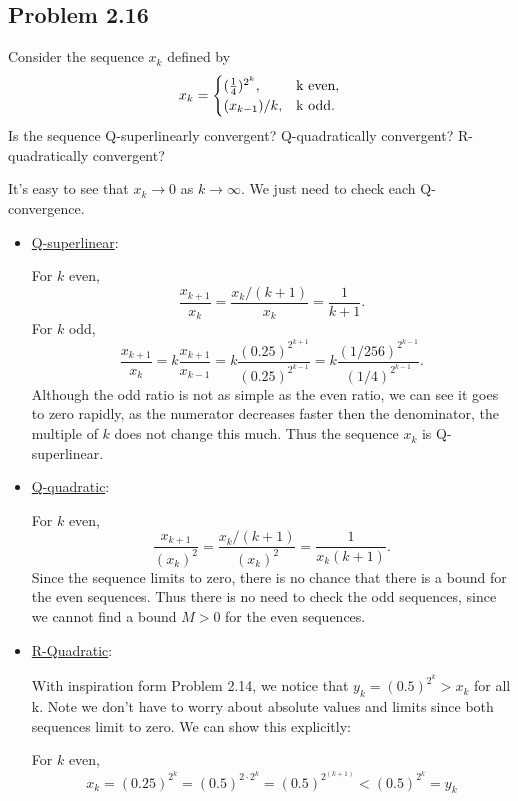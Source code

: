  \subsection{Problem 2.16}
 Consider the sequence $x_k$ defined by 
 \[
 x_k = \begin{cases}
     (\frac{1}{4})^{2^k}, &$k$ \text{ even},\\
     (x_{k-1}) / k, &$k$ \text{ odd.}
 \end{cases}
 \]
 Is the sequence Q-superlinearly convergent? Q-quadratically convergent? R-quadratically convergent?
 \partbreak
 \begin{solution}
 
     It's easy to see that $x_k \rightarrow 0$ as $k \rightarrow \infty$. We just need to check each Q-convergence.

     \begin{itemize}
         \item \underline{Q-superlinear}:

        \hop
        For $k$ even,
        \[
        \frac{x_{k+1}}{x_{k}} = \frac{x_{k}/(k+1)}{x_k} = \frac{1}{k+1}.
        \]
        For $k$ odd, 
        \[
        \frac{x_{k+1}}{x_k} = k\frac{x_{k+1}}{x_{k-1}} = k\frac{(0.25)^{2^{k+1}}}{(0.25)^{2^{k-1}}} = k\frac{(1/256)^{2^{k-1}}}{(1/4)^{2^{k-1}}}.
        \]
        Although the odd ratio is not as simple as the even ratio, we can see it goes to zero rapidly, as the numerator decreases faster then the denominator, the multiple of $k$ does not change this much. Thus the sequence $x_k$ is Q-superlinear. 

        \item \underline{Q-quadratic}:

        \hop
        For $k$ even,
        \[
        \frac{x_{k+1}}{(x_k)^2} = \frac{x_k / (k+1)}{(x_k)^2} = \frac{1}{x_k(k+1)}.
        \]
        Since the sequence limits to zero, there is no chance that there is a bound for the even sequences. Thus there is no need to check the odd sequences, since we cannot find a bound $M>0$ for the even sequences.

        \item \underline{R-Quadratic}:

        \hop
        With inspiration form Problem 2.14, we notice that $y_k = (0.5)^{2^k} > x_k$ for all k. Note we don't have to worry about absolute values and limits since both sequences limit to zero. We can show this explicitly:

        \hop
        For $k$ even, 
        \[
        x_k = (0.25)^{2^k} = (0.5)^{2\cdot 2^k} = (0.5)^{2^{(k+1)}} < (0.5)^{2^k} = y_k
        \]
        

\end{itemize}
\end{solution}
